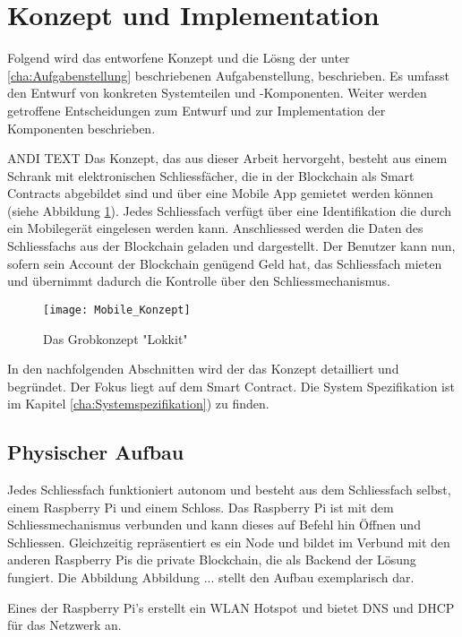 \section{Konzept und Implementation}
\label{sec:Konzeption}
Folgend wird das entworfene Konzept und die Lösng der unter \ref{cha:Aufgabenstellung} beschriebenen Aufgabenstellung, beschrieben. Es umfasst den Entwurf von konkreten Systemteilen und -Komponenten. Weiter werden getroffene Entscheidungen zum Entwurf und zur Implementation der Komponenten beschrieben.

ANDI TEXT
Das Konzept, das aus dieser Arbeit hervorgeht, besteht aus einem Schrank mit elektronischen Schliessfächer, die in der Blockchain als Smart Contracts abgebildet sind und über eine Mobile App gemietet werden können (siehe Abbildung \ref{fig:Grobkonzept}). Jedes Schliessfach verfügt über eine Identifikation die durch ein Mobilegerät eingelesen werden kann. Anschliessed werden die Daten des Schliessfachs aus der Blockchain geladen und dargestellt. Der Benutzer kann nun, sofern sein Account der Blockchain genügend Geld hat, das Schliessfach mieten und übernimmt dadurch die Kontrolle über den Schliessmechanismus. 

\begin{figure}
\centering
\texttt{[image: Mobile\_Konzept]}
\caption{Das Grobkonzept "Lokkit"}
\label{fig:Grobkonzept}
\end{figure}

In den nachfolgenden Abschnitten wird der das Konzept detailliert und begründet. Der Fokus liegt auf dem Smart Contract. Die System Spezifikation ist im Kapitel \ref{cha:Systemspezifikation}) zu finden.

\subsection{Physischer Aufbau}

Jedes Schliessfach funktioniert autonom und besteht aus dem Schliessfach selbst, einem Raspberry Pi und einem Schloss. Das Raspberry Pi ist mit dem Schliessmechanismus verbunden und kann dieses auf Befehl hin Öffnen und Schliessen. Gleichzeitig repräsentiert es ein Node und bildet im Verbund mit den anderen Raspberry Pis die private Blockchain, die als Backend der Lösung fungiert. Die Abbildung Abbildung ... stellt den Aufbau exemplarisch dar.

Eines der Raspberry Pi's erstellt ein WLAN Hotspot und bietet DNS und DHCP für das Netzwerk an.

